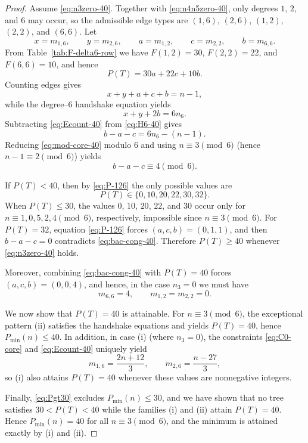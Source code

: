 \documentclass[preprint,12pt]{elsarticle}
\begin{document}
\begin{proof}
Assume \eqref{eq:n3zero-40}.
Together with \eqref{eq:n4n5zero-40}, only degrees $1$, $2$, and $6$ may occur,
so the admissible edge types are $(1,6)$, $(2,6)$, $(1,2)$, $(2,2)$, and $(6,6)$.
Let
\[
x=m_{1,6},\qquad y=m_{2,6},\qquad a=m_{1,2},\qquad c=m_{2,2},\qquad b=m_{6,6}.
\]
From Table~\ref{tab:F-delta6-row} we have $F(1,2)=30$, $F(2,2)=22$, and $F(6,6)=10$,
and hence
\begin{equation}
P(T)=30a+22c+10b.
\label{eq:P-126}
\end{equation}
Counting edges gives
\begin{equation}
x+y+a+c+b=n-1,
\label{eq:Ecount-40}
\end{equation}
while the degree--$6$ handshake equation yields
\begin{equation}
x+y+2b=6n_6.
\label{eq:H6-40}
\end{equation}
Subtracting \eqref{eq:Ecount-40} from \eqref{eq:H6-40} gives
\begin{equation}
b-a-c=6n_6-(n-1).
\label{eq:mod-core-40}
\end{equation}
Reducing \eqref{eq:mod-core-40} modulo $6$ and using $n\equiv 3\pmod 6$
(hence $n-1\equiv 2\pmod 6$) yields
\begin{equation}
b-a-c\equiv 4 \pmod 6.
\label{eq:bac-cong-40}
\end{equation}

If $P(T)<40$, then by \eqref{eq:P-126} the only possible values are
\[
P(T)\in\{0,10,20,22,30,32\}.
\]
When $P(T)\le 30$, the values $0$, $10$, $20$, $22$, and $30$ occur only for
$n\equiv 1,0,5,2,4\pmod 6$, respectively, impossible since $n\equiv 3\pmod 6$.
For $P(T)=32$, equation \eqref{eq:P-126} forces $(a,c,b)=(0,1,1)$, and then
$b-a-c=0$ contradicts \eqref{eq:bac-cong-40}.
Therefore $P(T)\ge 40$ whenever \eqref{eq:n3zero-40} holds.

Moreover, combining \eqref{eq:bac-cong-40} with $P(T)=40$ forces $(a,c,b)=(0,0,4)$,
and hence, in the case $n_3=0$ we must have
\begin{equation}
m_{6,6}=4,\qquad m_{1,2}=m_{2,2}=0.
\label{eq:C0-core}
\end{equation}

\medskip
We now show that $P(T)=40$ is attainable.
For $n\equiv 3\pmod 6$, the exceptional pattern \textup{(ii)} satisfies the handshake
equations and yields $P(T)=40$, hence $P_{\min}(n)\le 40$.
In addition, in case \textup{(i)} (where $n_3=0$), the constraints
\eqref{eq:C0-core} and \eqref{eq:Ecount-40} uniquely yield
\[
m_{1,6}=\frac{2n+12}{3},\qquad m_{2,6}=\frac{n-27}{3},
\]
so \textup{(i)} also attains $P(T)=40$ whenever these values are nonnegative integers.

\medskip
Finally, \eqref{eq:Pgt30} excludes $P_{\min}(n)\le 30$, and we have shown that
no tree satisfies $30<P(T)<40$ while the families \textup{(i)} and \textup{(ii)}
attain $P(T)=40$. Hence $P_{\min}(n)=40$ for all $n\equiv 3\pmod 6$, and the
minimum is attained exactly by \textup{(i)} and \textup{(ii)}.
\end{proof}
\end{document}
